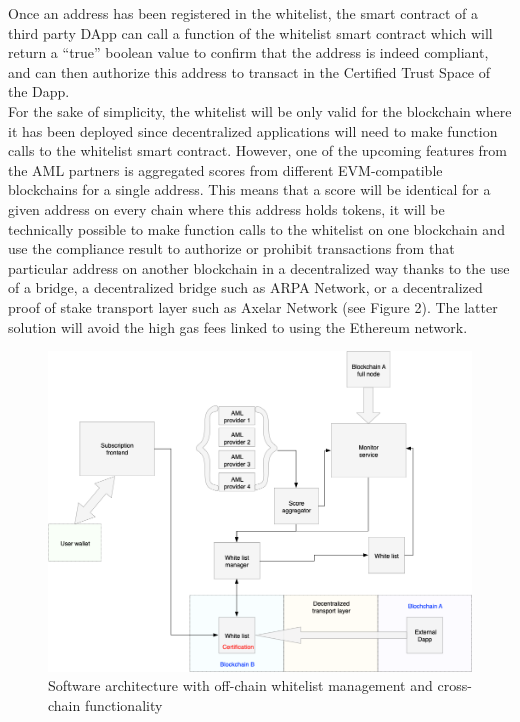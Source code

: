 ﻿\documentclass[a4paper]{article}
\let\OldTexttrademark\texttrademark
\renewcommand{\texttrademark}{\OldTexttrademark\xspace}%
\begin{document}
Once an address has been registered in the whitelist, the smart contract of a third party DApp can call a function of the whitelist smart contract which will return a “true” boolean value to confirm that the address is indeed compliant, and can then authorize this address to transact in the Certified Trust Space\texttrademark of the Dapp. \\

For the sake of simplicity, the whitelist will be only valid for the blockchain where it has been deployed since decentralized applications will need to make function calls to the whitelist smart contract. However, one of the upcoming features from the AML partners is aggregated scores from different EVM-compatible blockchains for a single address. This means that a score will be identical for a given address on every chain where this address holds tokens, it will be technically possible to make function calls to the whitelist on one blockchain and use the compliance result to authorize or prohibit transactions from that particular address on another blockchain in a decentralized way thanks to the use of a bridge, a decentralized bridge such as ARPA Network, or a decentralized proof of stake transport layer such as Axelar Network (see Figure 2). 
The latter solution will avoid the high gas fees linked to using the Ethereum network. \\

\begin{figure}[!h]
\centering
\includegraphics[scale=0.35]{architecture_v1_crosschain_trim.png}
\caption{Software architecture with off-chain whitelist management and cross-chain functionality}
\label{offchain}
\end{figure}  
\end{document}
